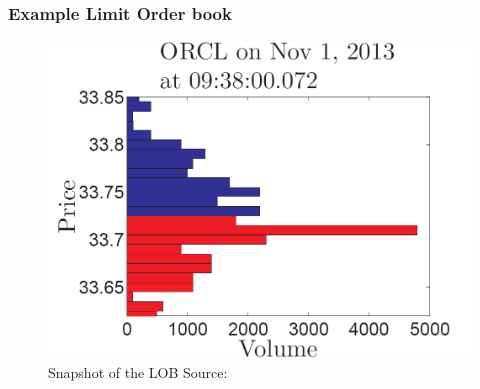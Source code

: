 \documentclass[aspectratio=1610]{beamer}
\begin{document}
  
    
%

\begin{frame}{}
\frametitle{\hfill Example Limit Order book}
    \begin{figure}[H]
    \centering
    \includegraphics[scale=.60]{LOBex.PNG}
    \caption{Snapshot of the LOB Source: \parencite{cartea2015algorithmic}}
    \label{fig:1}
\end{figure}
\end{frame}
\end{document}
